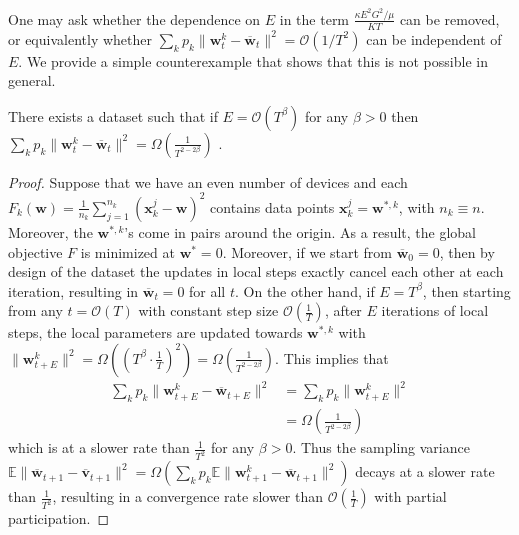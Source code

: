 One may ask whether the dependence on $E$ in the term $\frac{\kappa E^{2}G^{2}/\mu}{KT}$
can be removed, or equivalently whether $\sum_{k}p_{k}\|\mathbf{w}_{t}^{k}-\overline{\mathbf{w}}_{t}\|^{2}=\mathcal{O}(1/T^{2})$
can be independent of $E$. We provide a simple counterexample that
shows that this is not possible in general. 
\begin{proposition} \label{prop:tight}
	There exists a dataset such that if $E=\mathcal{O}(T^{\beta})$ for
	any $\beta>0$ then $\sum_{k}p_{k}\|\mathbf{w}_{t}^{k}-\overline{\mathbf{w}}_{t}\|^{2}=\Omega(\frac{1}{T^{2-2\beta}})$
	.
\end{proposition}
\begin{proof}
	Suppose that we have an even number of devices and each $F_{k}(\mathbf{w})=\frac{1}{n_{k}}\sum_{j=1}^{n_{k}}(\mathbf{x}_{k}^{j}-\mathbf{w})^{2}$
	contains data points $\mathbf{x}_{k}^{j}=\mathbf{w}^{\ast,k}$, with
	$n_{k}\equiv n$. Moreover, the $\mathbf{w}{}^{\ast,k}$'s come in
	pairs around the origin. As a result, the global objective $F$ is
	minimized at $\mathbf{w}^{\ast}=0$. Moreover, if we start from $\overline{\mathbf{w}}_{0}=0$,
	then by design of the dataset the updates in local steps exactly cancel
	each other at each iteration, resulting in $\overline{\mathbf{w}}_{t}=0$
	for all $t$. On the other hand, if $E=T^{\beta}$, then starting
	from any $t=\mathcal{O}(T)$ with constant step size $\mathcal{O}(\frac{1}{T})$,
	after $E$ iterations of local steps, the local parameters are updated
	towards $\mathbf{w}^{\ast,k}$ with $\|\mathbf{w}_{t+E}^{k}\|^{2}=\Omega((T^{\beta}\cdot\frac{1}{T})^{2})=\Omega(\frac{1}{T^{2-2\beta}})$.
	This implies that 
	\begin{align*}
	\sum_{k}p_{k}\|\mathbf{w}_{t+E}^{k}-\overline{\mathbf{w}}_{t+E}\|^{2} & =\sum_{k}p_{k}\|\mathbf{w}_{t+E}^{k}\|^{2}\\
	& =\Omega(\frac{1}{T^{2-2\beta}})
	\end{align*}
	which is at a slower rate than $\frac{1}{T^{2}}$ for any $\beta>0$.
	Thus the sampling variance $\mathbb{E}\|\overline{\mathbf{w}}_{t+1}-\overline{\mathbf{v}}_{t+1}\|^{2}=\Omega(\sum_{k}p_{k}\mathbb{E}\|\mathbf{w}_{t+1}^{k}-\overline{\mathbf{w}}_{t+1}\|^{2})$
	decays at a slower rate than $\frac{1}{T^{2}}$, resulting in a convergence
	rate slower than $\mathcal{O}(\frac{1}{T})$ with partial participation. 
\end{proof}